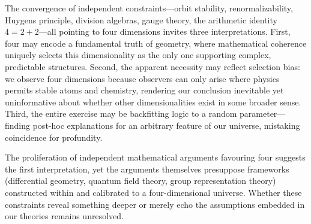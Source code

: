 \begin{commentary}
The convergence of independent constraints—orbit stability, renormalizability, Huygens principle, division algebras, gauge theory, the arithmetic identity $4=2+2$—all pointing to four dimensions invites three interpretations. First, four may encode a fundamental truth of geometry, where mathematical coherence uniquely selects this dimensionality as the only one supporting complex, predictable structures. Second, the apparent necessity may reflect selection bias: we observe four dimensions because observers can only arise where physics permits stable atoms and chemistry, rendering our conclusion inevitable yet uninformative about whether other dimensionalities \QSOpen{}exist\QSClose{} in some broader sense. Third, the entire exercise may be backfitting logic to a random parameter—finding post-hoc explanations for an arbitrary feature of our universe, mistaking coincidence for profundity. 

The proliferation of independent mathematical arguments favouring four suggests the first interpretation, yet the arguments themselves presuppose frameworks (differential geometry, quantum field theory, group representation theory) constructed within and calibrated to a four-dimensional universe. Whether these constraints reveal something deeper or merely echo the assumptions embedded in our theories remains unresolved. 
\end{commentary}

